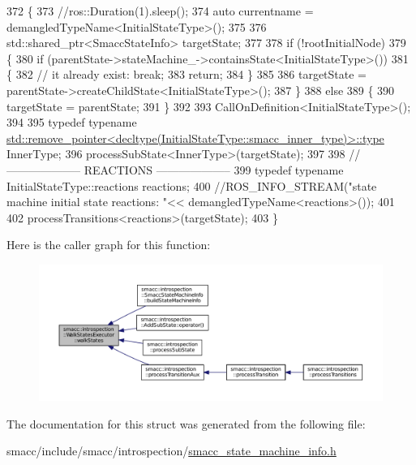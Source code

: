 \begin{DoxyCode}
372 \{
373     \textcolor{comment}{//ros::Duration(1).sleep();}
374     \textcolor{keyword}{auto} currentname = demangledTypeName<InitialStateType>();
375 
376     std::shared\_ptr<SmaccStateInfo> targetState;
377 
378     \textcolor{keywordflow}{if} (!rootInitialNode)
379     \{
380         \textcolor{keywordflow}{if} (parentState->stateMachine\_->containsState<InitialStateType>())
381         \{
382             \textcolor{comment}{// it already exist: break;}
383             \textcolor{keywordflow}{return};
384         \}
385 
386         targetState = parentState->createChildState<InitialStateType>();
387     \}
388     \textcolor{keywordflow}{else}
389     \{
390         targetState = parentState;
391     \}
392 
393     CallOnDefinition<InitialStateType>();
394 
395     \textcolor{keyword}{typedef} \textcolor{keyword}{typename} 
      \hyperlink{namespacegenerate__debs_a50bc9a7ecac9584553e089a448bcde58}{std::remove\_pointer<decltype(InitialStateType::smacc\_inner\_type)>::type}
       InnerType;
396     processSubState<InnerType>(targetState);
397 
398     \textcolor{comment}{// -------------------- REACTIONS --------------------}
399     \textcolor{keyword}{typedef} \textcolor{keyword}{typename} InitialStateType::reactions reactions;
400     \textcolor{comment}{//ROS\_INFO\_STREAM("state machine initial state reactions: "<< demangledTypeName<reactions>());}
401 
402     processTransitions<reactions>(targetState);
403 \}
\end{DoxyCode}


Here is the caller graph for this function\+:
\nopagebreak
\begin{figure}[H]
\begin{center}
\leavevmode
\includegraphics[width=350pt]{structsmacc_1_1introspection_1_1WalkStatesExecutor_a21848ccc6e7a7ddee0ccfff97e550ec6_icgraph}
\end{center}
\end{figure}




The documentation for this struct was generated from the following file\+:\begin{DoxyCompactItemize}
\item 
smacc/include/smacc/introspection/\hyperlink{smacc__state__machine__info_8h}{smacc\+\_\+state\+\_\+machine\+\_\+info.\+h}\end{DoxyCompactItemize}
